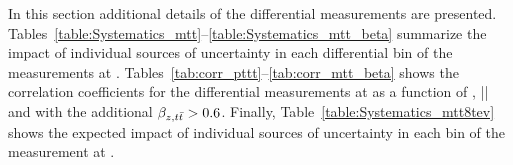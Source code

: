 In this section additional details of the differential measurements
are
presented. Tables~\ref{table:Systematics_mtt}--\ref{table:Systematics_mtt_beta}
summarize the impact of individual sources of uncertainty in each
differential bin of the measurements at
\seventev{}. Tables~\ref{tab:corr_pttt}--\ref{tab:corr_mtt_beta} shows
the correlation coefficients for the differential measurements at
\seventev{} as a function of \pttt{}, |\ytt{}| and \mtt{} with the
additional $\beta_{z,t\bar{t}}>0.6$. Finally, Table~\ref{table:Systematics_mtt8tev} shows
the expected impact of individual sources of uncertainty in each
\mtt{} bin of the measurement at \eighttev{}.


